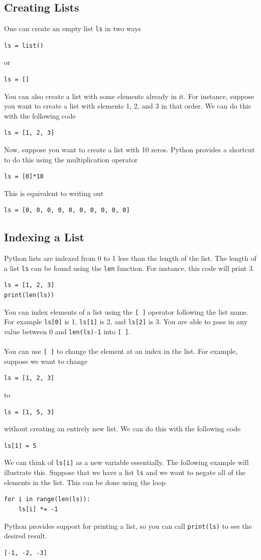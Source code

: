 \documentclass{article}
\begin{document}
\subsection{Creating Lists}
One can create an empty list \texttt{ls} in two ways
\begin{verbatim}
ls = list()
\end{verbatim}
or
\begin{verbatim}
ls = []
\end{verbatim}
You can also create a list with some elements already in it. For instance, suppose you want to create a list with elements 1, 2, and 3 in that order. We can do this with the following code
\begin{verbatim}
ls = [1, 2, 3]
\end{verbatim}
Now, suppose you want to create a list with 10 zeros. Python provides a shortcut to do this using the multiplication operator
\begin{verbatim}
ls = [0]*10
\end{verbatim}
This is equivalent to writing out
\begin{verbatim}
ls = [0, 0, 0, 0, 0, 0, 0, 0, 0, 0]
\end{verbatim}

\subsection{Indexing a List}
Python lists are indexed from 0 to 1 less than the length of the list. The length of a list \texttt{ls} can be found using the \texttt{len} function. For instance, this code will print 3.
\begin{verbatim}
ls = [1, 2, 3]
print(len(ls))
\end{verbatim}
You can index elements of a list using the \texttt{[ ]} operator following the list name. For example \texttt{ls[0]} is 1, \texttt{ls[1]} is 2, and \texttt{ls[2]} is 3. You are able to pass in any value between 0 and \texttt{len(ls)-1} into \texttt{[ ]}.\\\\
You can use \texttt{[ ]} to change the element at an index in the list. For example, suppose we want to change
\begin{verbatim}
ls = [1, 2, 3]
\end{verbatim}
to
\begin{verbatim}
ls = [1, 5, 3]
\end{verbatim}
without creating an entirely new list. We can do this with the following code
\begin{verbatim}
ls[1] = 5
\end{verbatim}
We can think of \texttt{ls[i]} as a new variable essentially. The following example will illustrate this. Suppose that we have a list \texttt{ls} and we want to negate all of the elements in the list. This can be done using the loop
\begin{verbatim}
for i in range(len(ls)):
    ls[i] *= -1
\end{verbatim}
Python provides support for printing a list, so you can call \texttt{print(ls)} to see the desired result.
\begin{verbatim}
[-1, -2, -3]
\end{verbatim}
\end{document}
